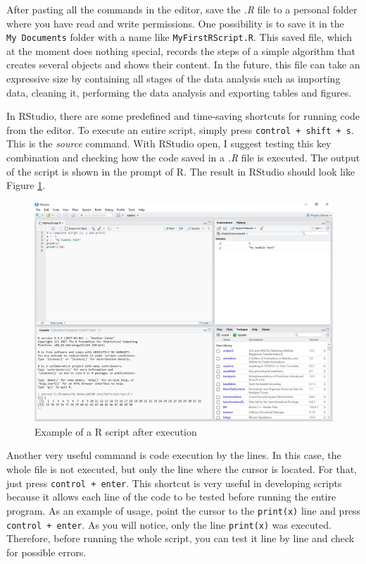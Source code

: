 \documentclass[11pt,]{book}
\begin{document}
After pasting all the commands in the editor, save the \emph{.R} file to
a personal folder where you have read and write permissions. One
possibility is to save it in the \texttt{My\ Documents} folder with a
name like \texttt{\textquotesingle{}MyFirstRScript.R\textquotesingle{}}.
This saved file, which at the moment does nothing special, records the
steps of a simple algorithm that creates several objects and shows their
content. In the future, this file can take an expressive size by
containing all stages of the data analysis such as importing data,
cleaning it, performing the data analysis and exporting tables and
figures.

In RStudio, there are some predefined and time-saving shortcuts for
running code from the editor. To execute an entire script, simply press
\texttt{control\ +\ shift\ +\ s}. This is the \emph{source} command.
With RStudio open, I suggest testing this key combination and checking
how the code saved in a \emph{.R} file is executed. The output of the
script is shown in the prompt of R. The result in RStudio should look
like Figure \ref{fig:example-script-source}. 

\begin{figure}[!htbp]

{\centering \includegraphics[width=1\linewidth]{figs/RStudio_example_script_source} 

}

\caption{Example of a R script after execution}\label{fig:example-script-source}
\end{figure}

Another very useful command is code execution by the lines. In this
case, the whole file is not executed, but only the line where the cursor
is located. For that, just press \texttt{control\ +\ enter}. This
shortcut is very useful in developing scripts because it allows each
line of the code to be tested before running the entire program. As an
example of usage, point the cursor to the \texttt{print(x)} line and
press \texttt{control\ +\ enter}. As you will notice, only the line
\texttt{print(x)} was executed. Therefore, before running the whole
script, you can test it line by line and check for possible errors.
\end{document}
